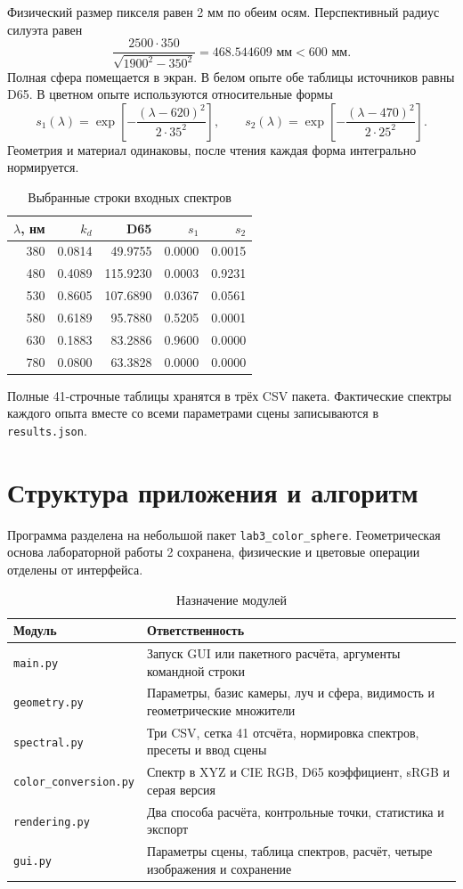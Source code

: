 \documentclass[a4paper,12pt]{article}
\newcommand{\code}[1]{\nolinkurl{#1}}
\begin{document}
Физический размер пикселя равен 2 мм по обеим осям. Перспективный радиус силуэта равен
\[
 \frac{2500\cdot350}{\sqrt{1900^2-350^2}}
 =468.544609\text{ мм}<600\text{ мм}.
\]
Полная сфера помещается в экран. В белом опыте обе таблицы источников равны D65. В цветном опыте используются относительные формы
\[
 s_1(\lambda)=\exp\!\left[-\frac{(\lambda-620)^2}{2\cdot35^2}\right],\qquad
 s_2(\lambda)=\exp\!\left[-\frac{(\lambda-470)^2}{2\cdot25^2}\right].
\]
Геометрия и материал одинаковы, после чтения каждая форма интегрально нормируется.

\begin{table}[H]\centering\small
\caption{Выбранные строки входных спектров}
\begin{tabular}{@{}rrrrr@{}}\toprule
$\lambda$, нм & $k_d$ & D65 & $s_1$ & $s_2$\\\midrule
380 & 0.0814 & 49.9755 & 0.0000 & 0.0015\\
480 & 0.4089 & 115.9230 & 0.0003 & 0.9231\\
530 & 0.8605 & 107.6890 & 0.0367 & 0.0561\\
580 & 0.6189 & 95.7880 & 0.5205 & 0.0001\\
630 & 0.1883 & 83.2886 & 0.9600 & 0.0000\\
780 & 0.0800 & 63.3828 & 0.0000 & 0.0000\\\bottomrule
\end{tabular}
\end{table}
Полные 41-строчные таблицы хранятся в трёх CSV пакета. Фактические спектры каждого опыта вместе со всеми параметрами сцены записываются в \code{results.json}.

\clearpage
\section{Структура приложения и алгоритм}

Программа разделена на небольшой пакет \code{lab3_color_sphere}. Геометрическая основа лабораторной работы 2 сохранена, физические и цветовые операции отделены от интерфейса.
\begin{table}[H]\centering\small
\caption{Назначение модулей}
\begin{tabularx}{\textwidth}{@{}lX@{}}\toprule
Модуль & Ответственность\\\midrule
\code{main.py} & Запуск GUI или пакетного расчёта, аргументы командной строки\\
\code{geometry.py} & Параметры, базис камеры, луч и сфера, видимость и геометрические множители\\
\code{spectral.py} & Три CSV, сетка 41 отсчёта, нормировка спектров, пресеты и ввод сцены\\
\code{color_conversion.py} & Спектр в XYZ и CIE RGB, D65 коэффициент, sRGB и серая версия\\
\code{rendering.py} & Два способа расчёта, контрольные точки, статистика и экспорт\\
\code{gui.py} & Параметры сцены, таблица спектров, расчёт, четыре изображения и сохранение\\\bottomrule
\end{tabularx}
\end{table}
\end{document}
